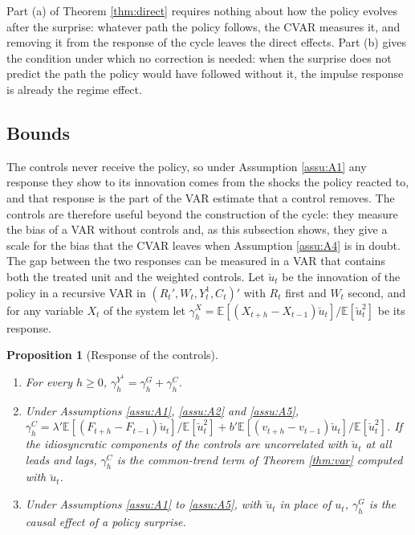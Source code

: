 \documentclass[12pt,a4paper]{article}
\newtheorem{prop}{Proposition}
\theoremstyle{definition}
\theoremstyle{definition}\newtheorem{example}{Example}
\theoremstyle{definition}\newtheorem{definition}{Definition}
\newcommand{\E}{\mathbb{E}}
\begin{document}
Part (a) of Theorem \ref{thm:direct} requires nothing about how the policy evolves after the surprise: whatever path the policy follows, the CVAR measures it, and removing it from the response of the cycle leaves the direct effects. Part (b) gives the condition under which no correction is needed: when the surprise does not predict the path the policy would have followed without it, the impulse response is already the regime effect.

\subsection{Bounds\label{sec:bounds}}

The controls never receive the policy, so under Assumption \ref{assu:A1} any response they show to its innovation comes from the shocks the policy reacted to, and that response is the part of the VAR estimate that a control removes. The controls are therefore useful beyond the construction of the cycle: they measure the bias of a VAR without controls and, as this subsection shows, they give a scale for the bias that the CVAR leaves when Assumption \ref{assu:A4} is in doubt. The gap between the two responses can be measured in a VAR that contains both the treated unit and the weighted controls. Let $\breve u_t$ be the innovation of the policy in a recursive VAR in $(R_t',W_t,Y^1_t,C_t)'$ with $R_t$ first and $W_t$ second, and for any variable $X_t$ of the system let $\gamma^X_h=\E[(X_{t+h}-X_{t-1})\breve u_t]/\E[\breve u_t^2]$ be its response.

\begin{prop}[Response of the controls\label{prop:placebo}]
\begin{enumerate}
\item[(a)] For every $h\geq0$, $\gamma^{Y^1}_h=\gamma^G_h+\gamma^C_h$.
\item[(b)] Under Assumptions \ref{assu:A1}, \ref{assu:A2} and \ref{assu:A5}, $\gamma^C_h=\lambda'\E[(F_{t+h}-F_{t-1})\breve u_t]/\E[\breve u_t^2]+b'\E[(v_{t+h}-v_{t-1})\breve u_t]/\E[\breve u_t^2]$. If the idiosyncratic components of the controls are uncorrelated with $\breve u_t$ at all leads and lags, $\gamma^C_h$ is the common-trend term of Theorem \ref{thm:var} computed with $\breve u_t$.
\item[(c)] Under Assumptions \ref{assu:A1} to \ref{assu:A5}, with $\breve u_t$ in place of $u_t$, $\gamma^G_h$ is the causal effect of a policy surprise.
\end{enumerate}
\end{prop}
\end{document}
